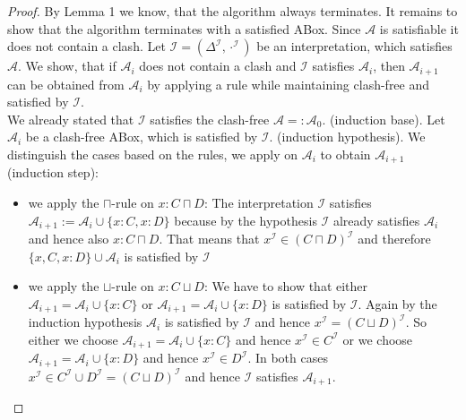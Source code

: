 \documentclass{book}
\theoremstyle{break}
\theoremstyle{definition}
\begin{document}
\begin{proof}
By Lemma 1 we know, that the algorithm always terminates. It remains to show that the algorithm terminates with a satisfied ABox. Since $\mathcal{A}$ is satisfiable it does not contain a clash. Let $\mathcal{I}=(\Delta^\mathcal{I},\cdot^\mathcal{I})$ be an interpretation, which satisfies $\mathcal{A}$. We show, that if $\mathcal{A}_i$ does not contain a clash and $\mathcal{I}$ satisfies $\mathcal{A}_i$, then $\mathcal{A}_{i+1}$ can be obtained from $\mathcal{A}_i$ by applying a rule while maintaining clash-free and satisfied by $\mathcal{I}$.\\
We already stated that $\mathcal{I}$ satisfies the clash-free $\mathcal{A}=:\mathcal{A}_{0}$. (induction base).
Let $\mathcal{A}_i$ be a clash-free ABox, which is satisfied by $\mathcal{I}$. (induction hypothesis).
We distinguish the cases based on the rules, we apply on $\mathcal{A}_i$ to obtain $\mathcal{A}_{i+1}$ (induction step):
\begin{itemize}
\item we apply the $\sqcap$-rule on $x:C\sqcap D$: The interpretation $\mathcal{I}$ satisfies $\mathcal{A}_{i+1}:=\mathcal{A}_i\cup\{x:C,x:D\}$ because by the hypothesis $\mathcal{I}$ already satisfies $\mathcal{A}_i$ and hence also $x:C\sqcap D$. That means that $x^\mathcal{I}\in(C\sqcap D)^\mathcal{I}$ and therefore $\{x,C,x:D\}\cup\mathcal{A}_i$ is satisfied by $\mathcal{I}$
\item we apply the $\sqcup$-rule on $x:C\sqcup D$: We have to show that either $\mathcal{A}_{i+1}=\mathcal{A}_i\cup\{x:C\}$ or $\mathcal{A}_{i+1}=\mathcal{A}_i\cup\{x:D\}$ is satisfied by $\mathcal{I}$. Again by the induction hypothesis $\mathcal{A}_i$ is satisfied by $\mathcal{I}$ and hence $x^\mathcal{I}=(C\sqcup D)^\mathcal{I}$. So either we choose $\mathcal{A}_{i+1}=\mathcal{A}_i\cup\{x:C\}$ and hence $x^\mathcal{I}\in C^\mathcal{I}$ or we choose $\mathcal{A}_{i+1}=\mathcal{A}_i\cup\{x:D\}$ and hence $x^\mathcal{I}\in D^\mathcal{I}$. In both cases $x^\mathcal{I}\in C^\mathcal{I}\cup D^\mathcal{I}=(C\sqcup D)^\mathcal{I}$ and hence $\mathcal{I}$ satisfies $\mathcal{A}_{i+1}$.

\end{itemize}
\end{proof}
\end{document}
